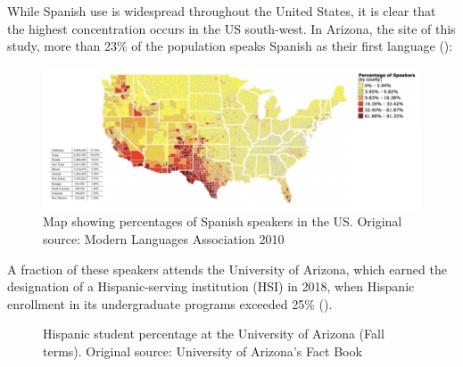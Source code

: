 \documentclass[output=paper]{../langscibook}
\begin{document}
While Spanish use is widespread throughout the United States, it is clear that the highest concentration occurs in the US south-west. In Arizona, the site of this study, more than 23\% of the population speaks Spanish as their first language ():

\begin{figure}
  \includegraphics[width=\textwidth]{figures/Chapter3-img003.png}
  \caption{Map showing percentages of Spanish speakers in the US. Original source: Modern Languages Association 2010}
  \label{fig:3:3}
\end{figure}


A fraction of these speakers attends the University of Arizona, which earned the designation of a Hispanic-serving institution (HSI) in 2018, when Hispanic enrollment in its undergraduate programs exceeded 25\% ().

  
 

\begin{figure}
\footnotesize
  \caption{Hispanic student percentage at the University of Arizona (Fall terms). Original source: University of Arizona's Fact Book}
    \label{fig:3:4}
\end{figure}
\end{document}

